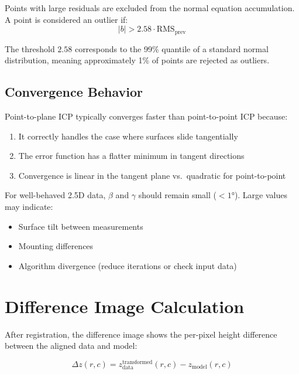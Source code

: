 \documentclass[11pt,a4paper]{article}
\begin{document}
Points with large residuals are excluded from the normal equation accumulation. A point is considered an outlier if:
\begin{equation}
|b| > 2.58 \cdot \text{RMS}_{\text{prev}}
\end{equation}

The threshold $2.58$ corresponds to the 99\% quantile of a standard normal distribution, meaning approximately 1\% of points are rejected as outliers.

\subsection{Convergence Behavior}

Point-to-plane ICP typically converges faster than point-to-point ICP because:
\begin{enumerate}
    \item It correctly handles the case where surfaces slide tangentially
    \item The error function has a flatter minimum in tangent directions
    \item Convergence is linear in the tangent plane vs.\ quadratic for point-to-point
\end{enumerate}

For well-behaved 2.5D data, $\beta$ and $\gamma$ should remain small ($< 1°$). Large values may indicate:
\begin{itemize}
    \item Surface tilt between measurements
    \item Mounting differences
    \item Algorithm divergence (reduce iterations or check input data)
\end{itemize}

\section{Difference Image Calculation}

After registration, the difference image shows the per-pixel height difference between the aligned data and model:

\begin{equation}
\Delta z(r, c) = z_{\text{data}}^{\text{transformed}}(r, c) - z_{\text{model}}(r, c)
\end{equation}
\end{document}
